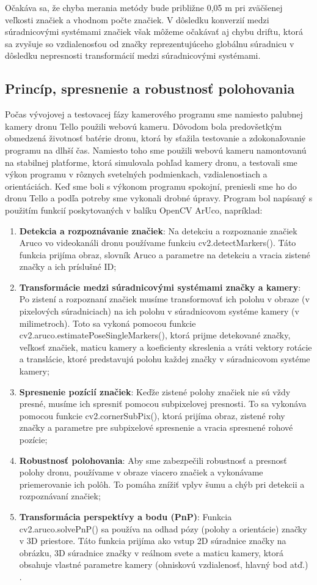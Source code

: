 {Očakáva sa, že chyba merania metódy bude približne 0,05 m pri zväčšenej veľkosti značiek a vhodnom počte značiek. V dôsledku konverzií medzi súradnicovými systémami značiek však môžeme očakávať aj chybu driftu, ktorá sa zvyšuje so vzdialenosťou od značky reprezentujúceho globálnu súradnicu v dôsledku nepresnosti transformácií medzi súradnicovými systémami.

\subsection{Princíp, spresnenie a robustnosť polohovania}
Počas vývojovej a testovacej fázy kamerového programu sme namiesto palubnej kamery dronu Tello použili webovú kameru. Dôvodom bola predovšetkým obmedzená životnosť batérie dronu, ktorá by sťažila testovanie a zdokonaľovanie programu na dlhší čas. Namiesto toho sme použili webovú kameru namontovanú na stabilnej platforme, ktorá simulovala pohľad kamery dronu, a testovali sme výkon programu v rôznych svetelných podmienkach, vzdialenostiach a orientáciách. Keď sme boli s výkonom programu spokojní, preniesli sme ho do dronu Tello a podľa potreby sme vykonali drobné úpravy.
Program bol napísaný s použitím funkcií poskytovaných v balíku OpenCV ArUco, napríklad:
\begin{enumerate}
\item \textbf{Detekcia a rozpoznávanie značiek}: Na detekciu a rozpoznanie značiek Aruco vo videokanáli dronu používame funkciu cv2.detectMarkers(). Táto funkcia prijíma obraz, slovník Aruco a parametre na detekciu a vracia zistené značky a ich príslušné ID;
\item \textbf{Transformácie medzi súradnicovými systémami značky a kamery}: Po zistení a rozpoznaní značiek musíme transformovať ich polohu v obraze (v pixelových súradniciach) na ich polohu v súradnicovom systéme kamery (v milimetroch). Toto sa vykoná pomocou funkcie cv2.aruco.estimatePoseSingleMarkers(), ktorá prijme detekované značky, veľkosť značiek, maticu kamery a koeficienty skreslenia a vráti vektory rotácie a translácie, ktoré predstavujú polohu každej značky v súradnicovom systéme kamery;
\item \textbf{Spresnenie pozícií značiek}: Keďže zistené polohy značiek nie sú vždy presné, musíme ich spresniť pomocou subpixelovej presnosti. To sa vykonáva pomocou funkcie cv2.cornerSubPix(), ktorá prijíma obraz, zistené rohy značky a parametre pre subpixelové spresnenie a vracia spresnené rohové pozície;
\item \textbf{Robustnosť polohovania}: Aby sme zabezpečili robustnosť a presnosť polohy dronu, používame v obraze viacero značiek a vykonávame priemerovanie ich polôh. To pomáha znížiť vplyv šumu a chýb pri detekcii a rozpoznávaní značiek;
\item \textbf{Transformácia perspektívy a bodu (PnP)}: Funkcia cv2.aruco.solvePnP() sa používa na odhad pózy (polohy a orientácie) značky v 3D priestore. Táto funkcia prijíma ako vstup 2D súradnice značky na obrázku, 3D súradnice značky v reálnom svete a maticu kamery, ktorá obsahuje vlastné parametre kamery (ohniskovú vzdialenosť, hlavný bod atď.) \citep{9549863}.
\end{enumerate}

}
